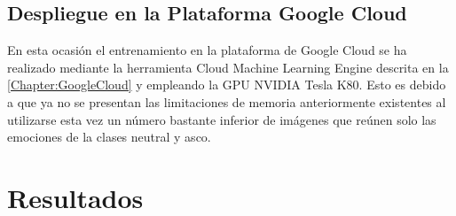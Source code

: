 \subsection{Despliegue en la Plataforma Google Cloud}

En esta ocasión el entrenamiento en la plataforma de Google Cloud se ha realizado mediante la herramienta Cloud Machine Learning Engine descrita en la \autoref{Chapter:GoogleCloud} y empleando la GPU NVIDIA Tesla K80. Esto es debido a que ya no se presentan las limitaciones de memoria anteriormente existentes al utilizarse esta vez un número bastante inferior de imágenes que reúnen solo las emociones de la clases neutral y asco.

\section{Resultados}